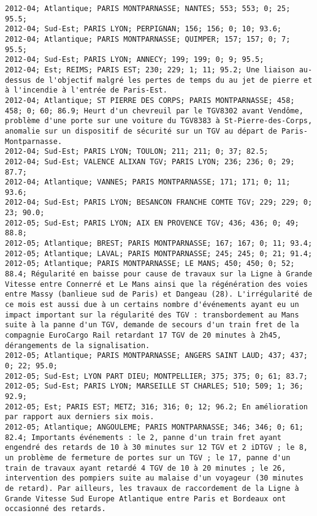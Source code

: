 \documentclass{article}
\begin{document}
\begin{Verbatim}[commandchars=\\\{\}]
2012-04; Atlantique; PARIS MONTPARNASSE; NANTES; 553; 553; 0; 25; 95.5; 
2012-04; Sud-Est; PARIS LYON; PERPIGNAN; 156; 156; 0; 10; 93.6; 
2012-04; Atlantique; PARIS MONTPARNASSE; QUIMPER; 157; 157; 0; 7; 95.5; 
2012-04; Sud-Est; PARIS LYON; ANNECY; 199; 199; 0; 9; 95.5; 
2012-04; Est; REIMS; PARIS EST; 230; 229; 1; 11; 95.2; Une liaison au-dessus de l'objectif malgré les pertes de temps du au jet de pierre et à l'incendie à l'entrée de Paris-Est.
2012-04; Atlantique; ST PIERRE DES CORPS; PARIS MONTPARNASSE; 458; 458; 0; 60; 86.9; Heurt d'un chevreuil par le TGV8302 avant Vendôme, problème d'une porte sur une voiture du TGV8383 à St-Pierre-des-Corps, anomalie sur un dispositif de sécurité sur un TGV au départ de Paris-Montparnasse.
2012-04; Sud-Est; PARIS LYON; TOULON; 211; 211; 0; 37; 82.5; 
2012-04; Sud-Est; VALENCE ALIXAN TGV; PARIS LYON; 236; 236; 0; 29; 87.7; 
2012-04; Atlantique; VANNES; PARIS MONTPARNASSE; 171; 171; 0; 11; 93.6; 
2012-04; Sud-Est; PARIS LYON; BESANCON FRANCHE COMTE TGV; 229; 229; 0; 23; 90.0; 
2012-05; Sud-Est; PARIS LYON; AIX EN PROVENCE TGV; 436; 436; 0; 49; 88.8; 
2012-05; Atlantique; BREST; PARIS MONTPARNASSE; 167; 167; 0; 11; 93.4; 
2012-05; Atlantique; LAVAL; PARIS MONTPARNASSE; 245; 245; 0; 21; 91.4; 
2012-05; Atlantique; PARIS MONTPARNASSE; LE MANS; 450; 450; 0; 52; 88.4; Régularité en baisse pour cause de travaux sur la Ligne à Grande Vitesse entre Connerré et Le Mans ainsi que la régénération des voies entre Massy (banlieue sud de Paris) et Dangeau (28). L'irrégularité de ce mois est aussi due à un certains nombre d'événements ayant eu un impact important sur la régularité des TGV : transbordement au Mans suite à la panne d'un TGV, demande de secours d'un train fret de la compagnie EuroCargo Rail retardant 17 TGV de 20 minutes à 2h45, dérangements de la signalisation.
2012-05; Atlantique; PARIS MONTPARNASSE; ANGERS SAINT LAUD; 437; 437; 0; 22; 95.0; 
2012-05; Sud-Est; LYON PART DIEU; MONTPELLIER; 375; 375; 0; 61; 83.7; 
2012-05; Sud-Est; PARIS LYON; MARSEILLE ST CHARLES; 510; 509; 1; 36; 92.9; 
2012-05; Est; PARIS EST; METZ; 316; 316; 0; 12; 96.2; En amélioration par rapport aux derniers six mois.
2012-05; Atlantique; ANGOULEME; PARIS MONTPARNASSE; 346; 346; 0; 61; 82.4; Importants événements : le 2, panne d'un train fret ayant engendré des retards de 10 à 30 minutes sur 12 TGV et 2 iDTGV ; le 8, un problème de fermeture de portes sur un TGV ; le 17, panne d'un train de travaux ayant retardé 4 TGV de 10 à 20 minutes ; le 26, intervention des pompiers suite au malaise d'un voyageur (30 minutes de retard). Par ailleurs, les travaux de raccordement de la Ligne à Grande Vitesse Sud Europe Atlantique entre Paris et Bordeaux ont occasionné des retards.

\end{Verbatim}
\end{document}
